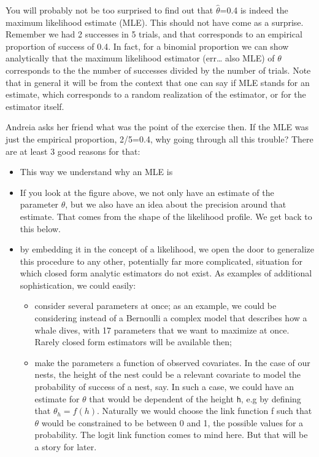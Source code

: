 \documentclass[
]{book}
\providecommand{\tightlist}{%
  \setlength{\itemsep}{0pt}\setlength{\parskip}{0pt}}
\begin{document}
You will probably not be too surprised to find out that \(\hat \theta\)=0.4 is indeed the maximum likelihood estimate (MLE). This should not have come as a surprise. Remember we had 2 successes in 5 trials, and that corresponds to an empirical proportion of success of 0.4. In fact, for a binomial proportion we can show analytically that the maximum likelihood estimator (err\ldots{} also MLE) of \(\theta\) corresponds to the the number of successes divided by the number of trials. Note that in general it will be from the context that one can say if MLE stands for an estimate, which corresponds to a random realization of the estimator, or for the estimator itself.

Andreia asks her friend what was the point of the exercise then. If the MLE was just the empirical proportion, 2/5=0.4, why going through all this trouble? There are at least 3 good reasons for that:

\begin{itemize}
\tightlist
\item
  This way we understand why an MLE is
\item
  If you look at the figure above, we not only have an estimate of the parameter \(\theta\), but we also have an idea about the precision around that estimate. That comes from the shape of the likelihood profile. We get back to this below.
\item
  by embedding it in the concept of a likelihood, we open the door to generalize this procedure to any other, potentially far more complicated, situation for which closed form analytic estimators do not exist. As examples of additional sophistication, we could easily:

  \begin{itemize}
  \tightlist
  \item
    consider several parameters at once; as an example, we could be considering instead of a Bernoulli a complex model that describes how a whale dives, with 17 parameters that we want to maximize at once. Rarely closed form estimators will be available then;
  \item
    make the parameters a function of observed covariates. In the case of our nests, the height of the nest could be a relevant covariate to model the probability of success of a nest, say. In such a case, we could have an estimate for \(\theta\) that would be dependent of the height \texttt{h}, e.g by defining that \(\theta_h=f(h)\). Naturally we would choose the link function f such that \(\theta\) would be constrained to be between 0 and 1, the possible values for a probability. The logit link function comes to mind here. But that will be a story for later.
  \end{itemize}
\end{itemize}
\end{document}
